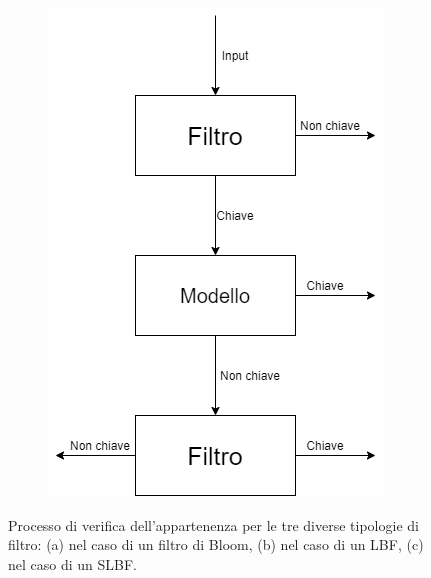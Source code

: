 \documentclass[../../main.tex]{subfiles}
\begin{document}
\begin{figure}[H]
\begin{subfigure}[c]{0.3\textwidth}
            \includegraphics[width=\textwidth]{immagini/5_2/SLBF.png}
            \caption{}
            \label{fig:appartenenzaSLBF}
        \end{subfigure}
        \caption{Processo di verifica dell'appartenenza per le tre diverse tipologie di filtro: (a) nel caso di un filtro di Bloom, (b) nel caso di un LBF, (c) nel caso di un SLBF.}
        \label{fig:DifferenzeFiltri}
    \end{figure}
\end{document}
